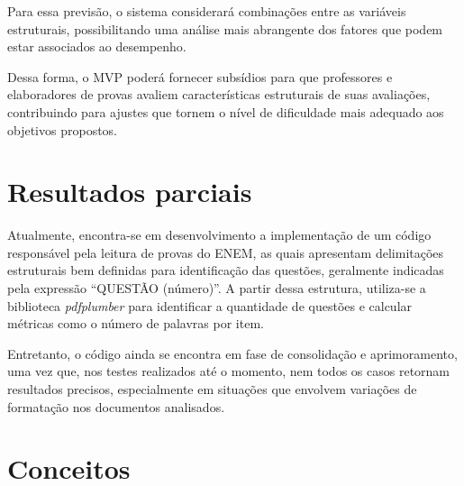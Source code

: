\documentclass[a4paper,10pt, twocolumn]{article}
\begin{document}
Para essa previsão, o sistema considerará combinações entre as variáveis estruturais, possibilitando uma análise mais abrangente dos fatores que podem estar associados ao desempenho.

Dessa forma, o MVP poderá fornecer subsídios para que professores e elaboradores de provas avaliem características estruturais de suas avaliações, contribuindo para ajustes que tornem o nível de dificuldade mais adequado aos objetivos propostos.
\section{Resultados parciais} 
Atualmente, encontra-se em desenvolvimento a implementação de um código responsável pela leitura de provas do ENEM, as quais apresentam delimitações estruturais bem definidas para identificação das questões, geralmente indicadas pela expressão “QUESTÃO (número)”. A partir dessa estrutura, utiliza-se a biblioteca \textit{pdfplumber} para identificar a quantidade de questões e calcular métricas como o número de palavras por item.

Entretanto, o código ainda se encontra em fase de consolidação e aprimoramento, uma vez que, nos testes realizados até o momento, nem todos os casos retornam resultados precisos, especialmente em situações que envolvem variações de formatação nos documentos analisados.





\section{Conceitos}
\end{document}
